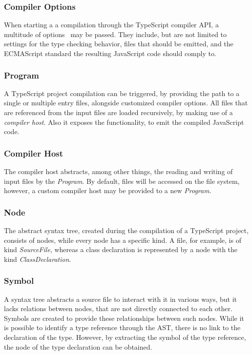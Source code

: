 \subsubsection{Compiler Options}

When starting a a compilation through the TypeScript compiler API, a multitude of options~\cite{TypeScriptHandbook:CompilerOptions} may be passed. They include, but are not limited to settings for the type checking behavior, files that should be emitted, and the ECMAScript standard the resulting JavaScript code should comply to.

\subsubsection{Program}

A TypeScript project compilation can be triggered, by providing the path to a single or multiple entry files, alongside customized compiler options. All files that are referenced from the input files are loaded recursively, by making use of a \emph{compiler host}. Also it exposes the functionality, to emit the compiled JavaScript code.

\subsubsection{Compiler Host}

The compiler host abstracts, among other things, the reading and writing of input files by the \emph{Program}. By default, files will be accessed on the file system, however, a custom compiler host may be provided to a new \emph{Program}.

\subsubsection{Node}

The abstract syntax tree, created during the compilation of a TypeScript project, consists of nodes, while every node has a specific kind. A file, for example, is of kind \emph{SourceFile}, whereas a class declaration is represented by a node with the kind \emph{ClassDeclaration}.

\subsubsection{Symbol}

A syntax tree abstracts a source file to interact with it in various ways, but it lacks relations between nodes, that are not directly connected to each other. Symbols are created to provide these relationships between such nodes. While it is possible to identify a type reference through the AST, there is no link to the declaration of the type. However, by extracting the symbol of the type reference, the node of the type declaration can be obtained.

